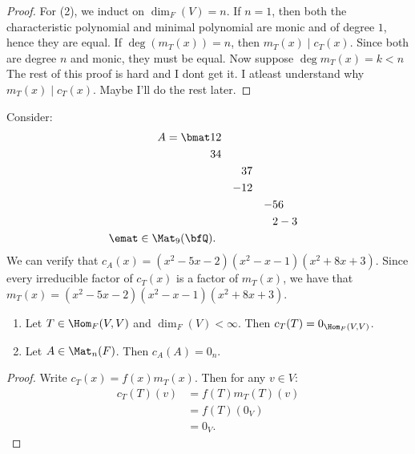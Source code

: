 \begin{proof}
            For (2), we induct on $\dim_F(V) = n$. If $n = 1$, then both the characteristic polynomial and minimal polynomial are monic and of degree $1$, hence they are equal. If $\deg{(m_T(x))} = n$, then $m_T(x) \mid c_T(x)$. Since both are degree $n$ and monic, they must be equal. Now suppose $\deg{m_T(x)} = k < n$ {\color{red}  The rest of this proof is hard and I dont get it. I atleast understand why $m_T(x) \mid c_T(x)$. Maybe I'll do the rest later}.
        \end{proof}

    \begin{example}
        Consider:
            \begin{equation*}
            \begin{split}
                A = 
                \bmat
                1& 2 \\
                3 & 4 \\
                & & 3 & 7 \\
                & & -1 & 2 \\
                & & & & -5 & 6 \\
                & & & & 2 & -3 \\
                \emat \in \Mat_9(\bfQ).
            \end{split}
            \end{equation*}
        We can verify that $c_A(x) = (x^2-5x-2)(x^2-x-1)(x^2+8x+3)$. Since every irreducible factor of $c_T(x)$ is a factor of $m_T(x)$, we have that $m_T(x) = (x^2-5x-2)(x^2-x-1)(x^2+8x+3)$.
    \end{example}

    \begin{theorem}\label{thm:cayley-hamilton}
        \phantom{a}
        \begin{enumerate}[label = (\arabic*)]
            \item Let $T \in \Hom_F(V,V)$ and $\dim_F(V) < \infty$. Then $c_T(T) = 0_{\Hom_F{(V,V)}}$.
            \item Let $A \in \Mat_n(F)$. Then $c_A(A) = 0_n$.
        \end{enumerate}
    \end{theorem}
        \begin{proof}
            Write $c_T(x) = f(x)m_T(x)$. Then for any $v \in V$:
                \begin{equation*}
                \begin{split}
                    c_T(T)(v)
                    & = f(T)m_T(T)(v) \\
                    & = f(T)(0_V) \\
                    & = 0_V.
                \end{split}
                \end{equation*}
        \end{proof}

